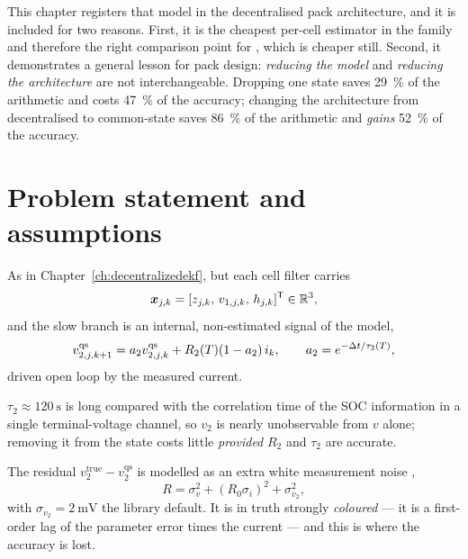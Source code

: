 This chapter registers that model in the decentralised pack architecture, and it is included for
two reasons. First, it is the cheapest per-cell estimator in the family and therefore the right
comparison point for , which is cheaper still. Second, it demonstrates a general
lesson for pack design: \emph{reducing the model} and \emph{reducing the architecture} are not
interchangeable. Dropping one state saves \SI{29}{\percent} of the arithmetic and costs
\SI{47}{\percent} of the accuracy; changing the architecture from decentralised to common-state
saves \SI{86}{\percent} of the arithmetic and \emph{gains} \SI{52}{\percent} of the accuracy.

\section{Problem statement and assumptions}
As in Chapter~\ref{ch:decentralizedekf}, but each cell filter carries
\begin{equation}
\bm{x}_{j,k} = [z_{j,k},\,v_{1,j,k},\,h_{j,k}]^{\mathsf{T}}\in\mathbb{R}^{3},
\label{eq:dre-state}
\end{equation}
and the slow branch is an internal, non-estimated signal of the model,
\begin{equation}
v_{2,j,k+1}^{\text{qs}} = a_2 v_{2,j,k}^{\text{qs}} + R_2(T)(1-a_2)\,i_k,\qquad a_2=e^{-\Delta t/\tau_2(T)},
\label{eq:dre-v2qs}
\end{equation}
driven open loop by the measured current.

\begin{assumption}\label{as:dre-slow}
$\tau_2\approx\SI{120}{\second}$ is long compared with the correlation time of the SOC
information in a single terminal-voltage channel, so $v_2$ is nearly unobservable from $v$ alone;
removing it from the state costs little \emph{provided} $R_2$ and $\tau_2$ are accurate.
\end{assumption}
\begin{assumption}\label{as:dre-noise}
The residual $v_{2}^{\text{true}}-v_2^{\text{qs}}$ is modelled as an extra white measurement noise
\cite[Ch.~10]{simon2006},
\begin{equation}
R = \sigma_v^2 + (R_0\sigma_i)^2 + \sigma_{v_2}^2 ,
\label{eq:dre-R}
\end{equation}
with $\sigma_{v_2}=\SI{2}{\milli\volt}$ the library default. It is in truth strongly
\emph{coloured} --- it is a first-order lag of the parameter error times the current --- and this
is where the accuracy is lost.
\end{assumption}

